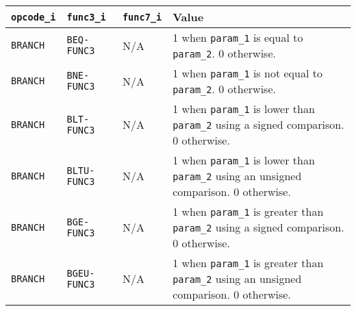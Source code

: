 {
\footnotesize
\begin{tabularx}{0.9\textwidth}{|l|l|l|X|}
  \hline
  \cellcolor{gray!20}\textbf{\texttt{opcode\_i}} & \cellcolor{gray!20}\textbf{\texttt{func3\_i}} & \cellcolor{gray!20}\textbf{\texttt{func7\_i}} & \cellcolor{gray!20}\textbf{Value} \\
  \hline
  \texttt{BRANCH} & \texttt{BEQ-FUNC3} & N/A & 1 when \texttt{param\_1} is equal to \texttt{param\_2}. 0 otherwise. \\
  \hline
  \texttt{BRANCH} & \texttt{BNE-FUNC3} & N/A & 1 when \texttt{param\_1} is not equal to \texttt{param\_2}. 0 otherwise. \\
  \hline
  \texttt{BRANCH} & \texttt{BLT-FUNC3} & N/A & 1 when \texttt{param\_1} is lower than \texttt{param\_2} using a signed comparison. 0 otherwise. \\
  \hline
  \texttt{BRANCH} & \texttt{BLTU-FUNC3} & N/A & 1 when \texttt{param\_1} is lower than \texttt{param\_2} using an unsigned comparison. 0 otherwise. \\
  \hline
  \texttt{BRANCH} & \texttt{BGE-FUNC3} & N/A & 1 when \texttt{param\_1} is greater than \texttt{param\_2} using a signed comparison. 0 otherwise. \\
  \hline
  \texttt{BRANCH} & \texttt{BGEU-FUNC3} & N/A & 1 when \texttt{param\_1} is greater than \texttt{param\_2} using an unsigned comparison. 0 otherwise. \\
  \hline
\end{tabularx}
}
